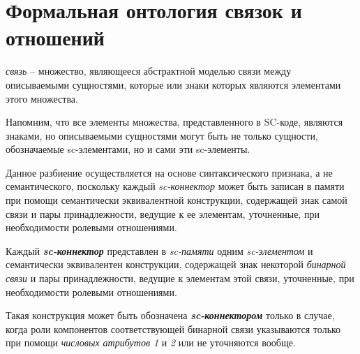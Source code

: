 \section{Формальная онтология связок и отношений}
\label{sec_top_ontologies_rel}

\textit{связь} -- множество, являющееся абстрактной моделью связи между описываемыми сущностями, которые или знаки которых являются элементами этого множества.

Напомним, что все элементы множества, представленного в SC-коде, являются знаками, но описываемыми сущностями могут быть не только сущности, обозначаемые sc-элементами, но и сами эти sc-элементы.

\begin{SCn}
\end{SCn}

\begin{SCn}
\begin{scnsubdividing}
\end{scnsubdividing}

\begin{scnsubdividing}
\end{scnsubdividing}
	
\begin{scnsubdividing}
\end{scnsubdividing}
\end{SCn}

Данное разбиение осуществляется на основе синтаксического признака, а не семантического, поскольку каждый \textit{sc-коннектор} может быть записан в памяти при помощи семантически эквивалентной конструкции, содержащей знак самой связи и пары принадлежности, ведущие к ее элементам, уточненные, при необходимости ролевыми отношениями.

Каждый \textbf{\textit{sc-коннектор}} представлен в \textit{sc-памяти} одним \textit{sc-элементом} и семантически эквивалентен конструкции, содержащей знак некоторой \textit{бинарной связи} и пары принадлежности, ведущие к элементам этой связи, уточненные, при необходимости ролевыми отношениями.

\begin{SCn}
Такая конструкция может быть обозначена \textbf{\textit{sc-коннектором}} только в случае, когда роли компонентов соответствующей бинарной связи указываются только при помощи \textit{числовых атрибутов 1\scnrolesign} и \textit{2\scnrolesign} или не уточняются вообще.
\end{SCn}
	

